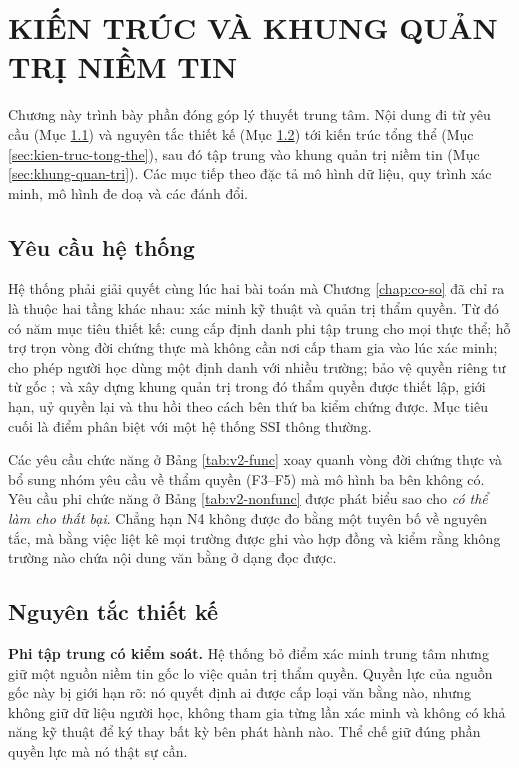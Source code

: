 \chapter{KIẾN TRÚC VÀ KHUNG QUẢN TRỊ NIỀM TIN}
\label{chap:kien-truc}

Chương này trình bày phần đóng góp lý thuyết trung tâm. Nội dung đi từ yêu cầu (Mục \ref{sec:yeu-cau}) và nguyên tắc thiết kế (Mục \ref{sec:nguyen-tac}) tới kiến trúc tổng thể (Mục \ref{sec:kien-truc-tong-the}), sau đó tập trung vào khung quản trị niềm tin (Mục \ref{sec:khung-quan-tri}). Các mục tiếp theo đặc tả mô hình dữ liệu, quy trình xác minh, mô hình đe doạ và các đánh đổi.

\section{Yêu cầu hệ thống}
\label{sec:yeu-cau}

Hệ thống phải giải quyết cùng lúc hai bài toán mà Chương \ref{chap:co-so} đã chỉ ra là thuộc hai tầng khác nhau: xác minh kỹ thuật và quản trị thẩm quyền. Từ đó có năm mục tiêu thiết kế: cung cấp định danh phi tập trung cho mọi thực thể; hỗ trợ trọn vòng đời chứng thực mà không cần nơi cấp tham gia vào lúc xác minh; cho phép người học dùng một định danh với nhiều trường; bảo vệ quyền riêng tư từ gốc \cite{Cavoukian2009}; và xây dựng khung quản trị trong đó thẩm quyền được thiết lập, giới hạn, uỷ quyền lại và thu hồi theo cách bên thứ ba kiểm chứng được. Mục tiêu cuối là điểm phân biệt với một hệ thống SSI thông thường.

Các yêu cầu chức năng ở Bảng \ref{tab:v2-func} xoay quanh vòng đời chứng thực và bổ sung nhóm yêu cầu về thẩm quyền (F3--F5) mà mô hình ba bên không có. Yêu cầu phi chức năng ở Bảng \ref{tab:v2-nonfunc} được phát biểu sao cho \emph{có thể làm cho thất bại}. Chẳng hạn N4 không được đo bằng một tuyên bố về nguyên tắc, mà bằng việc liệt kê mọi trường được ghi vào hợp đồng và kiểm rằng không trường nào chứa nội dung văn bằng ở dạng đọc được.





\section{Nguyên tắc thiết kế}
\label{sec:nguyen-tac}

\textbf{Phi tập trung có kiểm soát.} Hệ thống bỏ điểm xác minh trung tâm nhưng giữ một nguồn niềm tin gốc lo việc quản trị thẩm quyền. Quyền lực của nguồn gốc này bị giới hạn rõ: nó quyết định ai được cấp loại văn bằng nào, nhưng không giữ dữ liệu người học, không tham gia từng lần xác minh và không có khả năng kỹ thuật để ký thay bất kỳ bên phát hành nào. Thể chế giữ đúng phần quyền lực mà nó thật sự cần.

